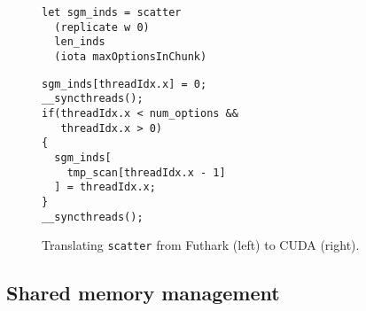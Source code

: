 %
\begin{figure}[bt]
\begin{center}
\begin{minipage}[t]{0.45\linewidth}
\vspace{0pt}
\begin{lstlisting}
let sgm_inds = scatter
  (replicate w 0)
  len_inds
  (iota maxOptionsInChunk)
\end{lstlisting}
\end{minipage}
\begin{minipage}[t]{0.45\linewidth}
\vspace{0pt}
\begin{lstlisting}
sgm_inds[threadIdx.x] = 0;
__syncthreads();
if(threadIdx.x < num_options &&
   threadIdx.x > 0)
{
  sgm_inds[
    tmp_scan[threadIdx.x - 1]
  ] = threadIdx.x;
}
__syncthreads();
\end{lstlisting}
\end{minipage}
\caption{Translating \texttt{scatter} from Futhark (left) to
  CUDA (right).}
\end{center}
\end{figure}


\subsection{Shared memory management}
